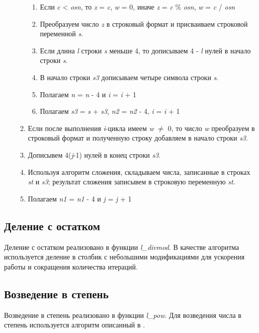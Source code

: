 \begin{enumerate}
\begin{enumerate}
\begin{enumerate}
            \item Если \textit{c} < \textit{osn}, то \textit{z} = \textit{c}, \textit{w} = 0, иначе \textit{z} = \textit{c} \% \textit{osn}, \textit{w} = \textit{c} / \textit{osn}
            \item Преобразуем число \textit{z} в строковый формат и присваиваем строковой переменной \textit{s}.
            \item Если длина \textit{l} строки \textit{s} меньше 4, то дописываем 4 - \textit{l} нулей в начало строки \textit{s}.
            \item В начало строки \textit{s3} дописываем четыре символа строки \textit{s}.
            \color{red}
            \item Полагаем \textit{n} = \textit{n} - 4 и \textit{i} = \textit{i} + 1
            \color{black}
            \color{green}
            \item Полагаем \textit{s3} = \textit{s} + \textit{s3}, \textit{n2} = \textit{n2} - 4, \textit{i} = \textit{i} + 1
            \color{black}
        \end{enumerate}
        \item Если после выполнения \textit{i}-цикла имеем \textit{w} $\neq$ 0, то число \textit{w} преобразуем в строковый формат и полученную строку добавляем в начало строки \textit{s3}.
        \item Дописывем 4(\textit{j}-1) нулей в конец строки \textit{s3}.
        \item Используя алгоритм сложения, складываем числа, записанные в строках \textit{st} и \textit{s3}; результат сложения записывем в строковую переменную \textit{st}.
        \item Полагаем \textit{n1} = \textit{n1} - 4 и \textit{j} = \textit{j} + 1
    \end{enumerate}
\end{enumerate}

\subsection{Деление с остатком}
Деление с остатком реализовано в функции \textit{l\_divmod}. В качестве алгоритма используется деление в столбик
с небольшими модификациями для ускорения работы и сокращения количества итераций.

\subsection{Возведение в степень}
Возведение в степень реализовано в функции \textit{l\_pow}. Для возведения числа в степень используется алгоритм описанный в \cite{zavg}.

